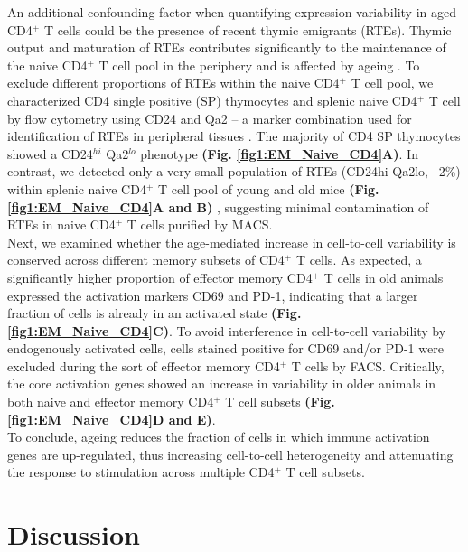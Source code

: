 An additional confounding factor when quantifying expression variability in aged CD4$^+$ T cells could be the presence of recent thymic emigrants (RTEs). Thymic output and maturation of RTEs contributes significantly to the maintenance of the naive CD4$^+$ T cell pool in the periphery and is affected by ageing \citep{Boursalian2004, Hale2006, Fink2013}. To exclude different proportions of RTEs within the naive CD4$^+$ T cell pool, we characterized CD4 single positive (SP) thymocytes and splenic naive CD4$^+$ T cell by flow cytometry using CD24 and Qa2 – a marker combination used for identification of RTEs in peripheral tissues \citep{Boursalian2004, Hale2006}. The majority of CD4 SP thymocytes showed a CD24$^{hi}$ Qa2$^{lo}$ phenotype \textbf{(Fig. \ref{fig1:EM_Naive_CD4}A)}. In contrast, we detected only a very small population of RTEs (CD24hi Qa2lo, ~2\%) within splenic naive CD4$^+$ T cell pool of young and old mice \textbf{(Fig. \ref{fig1:EM_Naive_CD4}A and B)} \citep{Hale2006}, suggesting minimal contamination of RTEs in naive CD4$^+$ T cells purified by MACS.\\

Next, we examined whether the age-mediated increase in cell-to-cell variability is conserved across different memory subsets of CD4$^+$ T cells. As expected, a significantly higher proportion of effector memory CD4$^+$ T cells in old animals expressed the activation markers CD69 and PD-1, indicating that a larger fraction of cells is already in an activated state \textbf{(Fig. \ref{fig1:EM_Naive_CD4}C)}. To avoid interference in cell-to-cell variability by endogenously activated cells, cells stained positive for CD69 and/or PD-1 were excluded during the sort of effector memory CD4$^+$ T cells by FACS. Critically, the core activation genes showed an increase in variability in older animals in both naive and effector memory CD4$^+$ T cell subsets \textbf{(Fig. \ref{fig1:EM_Naive_CD4}D and E)}.\\

To conclude, ageing reduces the fraction of cells in which immune activation genes are up-regulated, thus increasing cell-to-cell heterogeneity and attenuating the response to stimulation across multiple CD4$^+$ T cell subsets.

\newpage

\section{Discussion}

